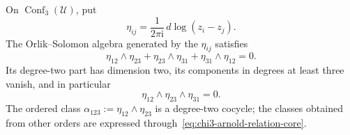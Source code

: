 \providecommand{\Muk}{\mathrm{Muk}}
\providecommand{\CoHA}{\mathrm{CoHA}}
\providecommand{\SpCh}{\mathrm{Sp}^{\mathrm{ch}}}
\providecommand{\PhiFA}{\Phi^{\mathrm{FA}}}

\begin{lemma}
\label{lem:chi3-ordered-collision-algebra}
On \(\operatorname{Conf}_3(\mathcal U)\), put
\[
 \eta_{ij}=\frac{1}{2\pi\mathrm i}\,d\log(z_i-z_j).
\]
The Orlik--Solomon algebra generated by the \(\eta_{ij}\) satisfies
\begin{equation}
\label{eq:chi3-arnold-relation-core}
 \eta_{12}\wedge\eta_{23}
 +\eta_{23}\wedge\eta_{31}
 +\eta_{31}\wedge\eta_{12}=0.
\end{equation}
Its degree-two part has dimension two, its components in degrees at least
three vanish, and in particular
\begin{equation}
\label{eq:chi3-triple-arnold-zero-core}
 \eta_{12}\wedge\eta_{23}\wedge\eta_{31}=0.
\end{equation}
The ordered class
\(
 \alpha_{123}:=\eta_{12}\wedge\eta_{23}
\)
is a degree-two cocycle; the classes obtained from other orders are
expressed through~\eqref{eq:chi3-arnold-relation-core}.
\end{lemma}


